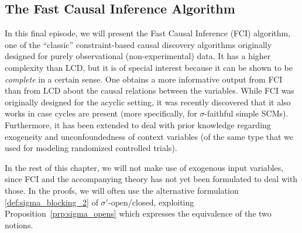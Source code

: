 \subsection{The Fast Causal Inference Algorithm}


In this final episode, we will present the Fast Causal Inference (FCI)
algorithm, one of the ``classic'' constraint-based causal discovery algorithms
originally designed for purely observational (non-experimental) data.
It has a higher complexity than LCD, but it is of special interest because
it can be shown to be \emph{complete} in a certain sense. 
One obtains a more informative output from FCI than from LCD about the
causal relations between the variables. While FCI was originally designed for
the acyclic setting, it was recently discovered that it also works in case cycles
are present (more specifically, for $\sigma$-faithful simple SCMs). 
Furthermore, it has been extended
to deal with prior knowledge regarding exogeneity and unconfoundedness of context
variables (of the same type that we used for modeling randomized controlled trials).

In the rest of this chapter, we will not make use of exogenous input variables, since FCI and the accompanying theory has not yet been formulated to deal with those.
In the proofs, we will often use the alternative formulation \ref{def:sigma_blocking_2} of $\sigma'$-open/closed,
exploiting Proposition~\ref{prp:sigma_opens} which expresses the equivalence of the two notions.


  
